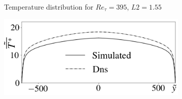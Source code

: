 \documentclass[10pt]{article} %
\begin{document}
\begin{figure}[h!]
\begin{subfigure}[t]{0.49\textwidth}
		\caption{Temperature distribution for $Re_\tau = 395$, $L2 = 1.55$}
		\end{subfigure}
		\begin{subfigure}[t]{0.49\textwidth}
		\centering
		\includegraphics[angle=0, scale=0.28]{fotos_formatacao_final/Temperature_640_071_classico}

\end{subfigure}
\end{figure}
\end{document}
